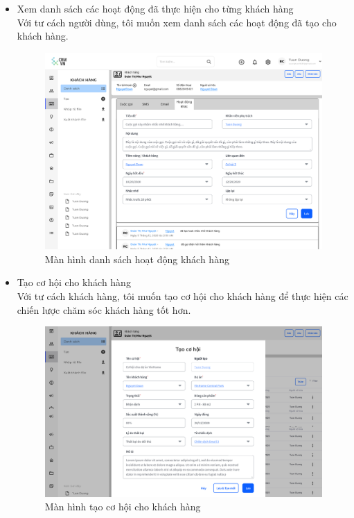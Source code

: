 \documentclass[12pt,a4paper]{article}
\begin{document}
\begin{enumerate}
\begin{itemize}
            \item Xem danh sách các hoạt động đã thực hiện cho từng khách hàng
            \\ Với tư cách người dùng, tôi muốn xem danh sách các hoạt động đã tạo cho khách hàng.

            \begin{figure}[H]
                \centering \includegraphics[width=\textwidth]{Img/Nguyet/Khachhang/HoatdongkhacKH.png}
                \vspace{0.5cm}
                \caption{Màn hình danh sách hoạt động khách hàng}
                \label{dshoatdongKH}
            \end{figure}

            \item Tạo cơ hội cho khách hàng \\
            Với tư cách khách hàng, tôi muốn tạo cơ hội cho khách hàng để thực hiện các chiến lược chăm sóc khách hàng tốt hơn.
            \begin{figure}[H]
                \centering \includegraphics[width=\textwidth]{Img/Nguyet/Khachhang/themCohoiKH.png}
                \vspace{0.5cm}
                \caption{Màn hình tạo cơ hội cho khách hàng}
                \label{themcohoiKH}
            \end{figure}


\end{itemize}
\end{enumerate}
\end{document}
